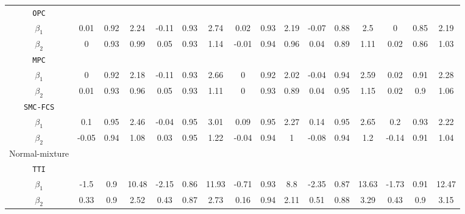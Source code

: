 \begin{table}[ht!]
{\begin{tabular}{c|ccc|ccc|ccc|ccc|ccc}
				\texttt{OPC}     &         &        &        &         &        &        &         &        &        &         &        &        &         &        &        \\
				$\beta_1$                         & 0.01   & 0.92  & 2.24  & -0.11   & 0.93  & 2.74   & 0.02   & 0.93  & 2.19  & -0.07   & 0.88  & 2.5  & 0   & 0.85  & 2.19  \\
				$\beta_2$                         & 0   & 0.93  & 0.99  & 0.05    & 0.93  & 1.14  & -0.01   & 0.94  & 0.96  & 0.04    & 0.89  & 1.11  & 0.02   & 0.86  & 1.03  \\
				\texttt{MPC}     &         &        &        &         &        &        &         &        &        &         &        &        &         &        &        \\
				$\beta_1$                         & 0   & 0.92  & 2.18  & -0.11   & 0.93  & 2.66  & 0   & 0.92  & 2.02  & -0.04    & 0.94  & 2.59  & 0.02   & 0.91  & 2.28  \\
				$\beta_2$                         & 0.01   & 0.93   & 0.96  & 0.05   & 0.93  & 1.11  & 0   & 0.93  & 0.89  & 0.04   & 0.95  & 1.15  & 0.02   & 0.9   & 1.06  \\
				\texttt{SMC-FCS} &         &        &        &         &        &        &         &        &        &         &        &        &         &        &        \\
				$\beta_1$                         & 0.1   & 0.95  & 2.46  & -0.04   & 0.95  & 3.01  & 0.09    & 0.95  & 2.27  & 0.14   & 0.95  & 2.65  & 0.2     & 0.93  & 2.22  \\
				$\beta_2$                         & -0.05   & 0.94  & 1.08  & 0.03  & 0.95  & 1.22  & -0.04   & 0.94  & 1  & -0.08   & 0.94  & 1.2    & -0.14   & 0.91  & 1.04  \\ \hline
				Normal-mixture                    &         &        &        &         &        &        &         &        &        &         &        &        &         &        &        \\
				\texttt{TTI}            &        &        &        &        &        &        &        &        &        &        &        &        &        &        &        \\
				$\beta_1$      & -1.5  & 0.9  & 10.48  & -2.15  & 0.86  & 11.93  & -0.71  & 0.93   & 8.8  & -2.35  & 0.87  & 13.63  & -1.73  & 0.91  & 12.47  \\
				$\beta_2$      & 0.33  & 0.9  & 2.52  & 0.43  & 0.87  & 2.73  & 0.16  & 0.94  & 2.11  & 0.51  & 0.88  & 3.29  & 0.43  & 0.9  & 3.15  \\

\end{tabular}}
\end{table}
